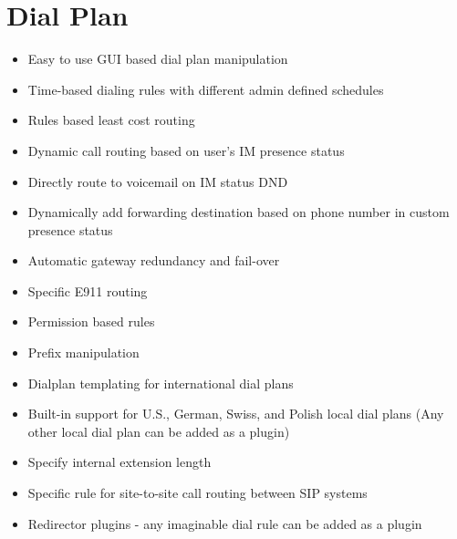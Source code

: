 \documentclass[letterpaper,10pt,english]{sphinxmanual}
\begin{document}
\section{Dial Plan}
\label{\detokenize{features:dial-plan}}\begin{itemize}
\item {} 
Easy to use GUI based dial plan manipulation

\item {} 
Time-based dialing rules with different admin defined schedules

\item {} 
Rules based least cost routing

\item {} 
Dynamic call routing based on user’s IM presence status

\item {} 
Directly route to voicemail on IM status DND

\item {} 
Dynamically add forwarding destination based on phone number in custom presence status

\item {} 
Automatic gateway redundancy and fail-over

\item {} 
Specific E911 routing

\item {} 
Permission based rules

\item {} 
Prefix manipulation

\item {} 
Dialplan templating for international dial plans

\item {} 
Built-in support for U.S., German, Swiss, and Polish local dial plans (Any other local dial plan can be added as a plugin)

\item {} 
Specify internal extension length

\item {} 
Specific rule for site-to-site call routing between SIP systems

\item {} 
Redirector plugins - any imaginable dial rule can be added as a plugin

\end{itemize}
\end{document}
